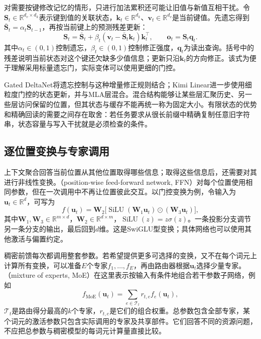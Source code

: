 对需要按键修改记忆的情形，只进行加法累积还可能让旧值与新值互相干扰。令$\bm S_t\in\mathbb R^{d_v\times d_k}$表示键到值的关联状态，$\bm k_t\in\mathbb R^{d_k}$、$\bm v_t\in\mathbb R^{d_v}$是当前键值。先遗忘得到$\bar{\bm S}_t=\alpha_t\bm S_{t-1}$，再按当前键上的预测残差更新：
\begin{equation}
 \bm S_t=\bar{\bm S}_t+
 \beta_t(\bm v_t-\bar{\bm S}_t\bm k_t)\bm k_t^{\top},
 \qquad \bm o_t=\bm S_t\bm q_t.
 \label{eq:nlp-llm-gated-delta}
\end{equation}
其中$\alpha_t\in(0,1)$控制遗忘，$\beta_t\in(0,1)$控制修正强度，$\bm q_t$为读出查询。括号中的残差说明当前状态对这个键还欠缺多少值信息；更新只沿$\bm k_t$的方向修正。该式为便于理解采用标量遗忘门，实际变体可以使用更细的门控。

Gated DeltaNet将遗忘控制与这种增量修正规则结合；Kimi Linear进一步使用细粒度门控的状态更新，并与MLA层混合。混合结构能够让某些层汇聚历史、另一些层访问保留的位置，但其状态与缓存不能再统一称为固定大小。有限状态的优势和精确回读的需要之间存在取舍：若任务要求从很长前缀中精确复制任意旧字符串，状态容量与写入干扰就是必须检查的条件。

\subsection{逐位置变换与专家调用}
\label{sec:nlp-llm-experts}

上下文聚合回答当前位置从其他位置取得哪些信息；取得这些信息后，还需要对其进行非线性变换。（position-wise feed-forward network, FFN）对每个位置使用相同参数，但在一次调用中不再让位置彼此交互。以门控变换为例，令输入为$\bm u_t\in\mathbb R^d$，可写为
\begin{equation}
 f(\bm u_t)=\bm W_2\bigl[
 \operatorname{SiLU}(\bm W_1\bm u_t)
 \odot(\bm W_3\bm u_t)\bigr],
 \label{eq:nlp-llm-ffn}
\end{equation}
其中$\bm W_1,\bm W_3\in\mathbb R^{m\times d}$，$\bm W_2\in\mathbb R^{d\times m}$，$\operatorname{SiLU}(z)=z\sigma(z)$。一条投影分支调节另一条分支的输出，最后回到$d$维。这是SwiGLU型变换；具体网络也可以使用其他激活与偏置约定。

稠密前馈每次都调用整套参数。若希望提供更多可选择的变换，又不在每个词元上计算所有变换，可以准备$E$个专家$f_1,\ldots,f_E$，再由路由器根据$\bm u_t$选择少量专家。（mixture of experts, MoE）在这里表示按输入有条件地组合若干参数子网络，例如
\begin{equation}
 f_{\mathrm{MoE}}(\bm u_t)=
 \sum_{e\in\mathcal T_t}r_{t,e} f_e(\bm u_t),
 \label{eq:nlp-llm-moe}
\end{equation}
$\mathcal T_t$是路由得分最高的$k$个专家，$r_{t,e}$是它们的组合权重。总参数包含全部专家，某个词元的激活参数只包含实际调用的专家及共享部件。它们回答不同的资源问题，不应把总参数与稠密模型的每词元计算量直接比较。

